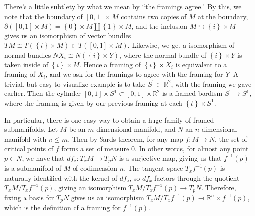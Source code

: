 \documentclass[psamsfonts]{amsart}
\theoremstyle{definition}
\theoremstyle{remark}
\newcommand{\R}{\mathbb{R}}
\newcommand{\inv}{^{-1}}
\newcommand{\set}[1]{\left\lbrace #1 \right\rbrace}
\newcommand{\bd}{\partial}
\begin{document}
There's a little subtlety by what we mean by ``the framings agree." By this, we note that the boundary of $[0,1] \times M$ contains two copies of $M$ at the boundary, $\bd([0,1] \times M) = \set{0} \times M \coprod \set{1} \times M$, and the inclusion $M \hookrightarrow \set{i} \times M$ gives us an isomorphism of vector bundles $TM \cong T(\set{i} \times M) \subset T([0,1] \times M)$. Likewise, we get a isomorphism of normal bundles $NX_i \cong N(\set{i} \times Y)$, where the normal bundle of $\set{i} \times Y$ is taken inside of $\set{i} \times M$. Hence a framing of $\set{i} \times X_i$ is equivalent to a framing of $X_i$, and we ask for the framings to agree with the framing for $Y$. A trivial, but easy to visualize example is to take $S^1 \subset \R^2$, with the framing we gave earlier. Then the cylinder $[0,1] \times S^1 \subset [0,1] \times \R^2$ is a framed bordism $S^1 \to S^1$, where the framing is given by our previous framing at each $\set{t} \times S^1$.

In particular, there is one easy way to obtain a huge family of framed submanifolds. Let $M$ be an $m$ dimensional manifold, and $N$ an $n$ dimensional manifold with $n \leq m$. Then by Sards theorem, for any map $f : M \to N$, the set of critical points of $f$ forms a set of measure $0$. In other words, for almost any point $p \in N$, we have that $df_x : T_xM \to T_pN$ is a surjective map, giving us that $f\inv(p)$ is a submanifold of $M$ of codimension $n$. The tangent space $T_xf\inv(p)$ is naturally identified with the kernel of $df_x$, so $df_x$ factors through the quotient $T_xM / T_xf\inv(p)$, giving an isomorphism $T_xM / T_xf\inv(p) \to T_pN$. Therefore, fixing a basis for $T_pN$ gives us an isomorphism $T_xM / T_xf\inv(p) \to \R^n \times f\inv(p)$, which is the definition of a framing for $f\inv(p)$.
%
\setcounter{section}{3}
%
\setcounter{thm}{0}
%
\end{document}
